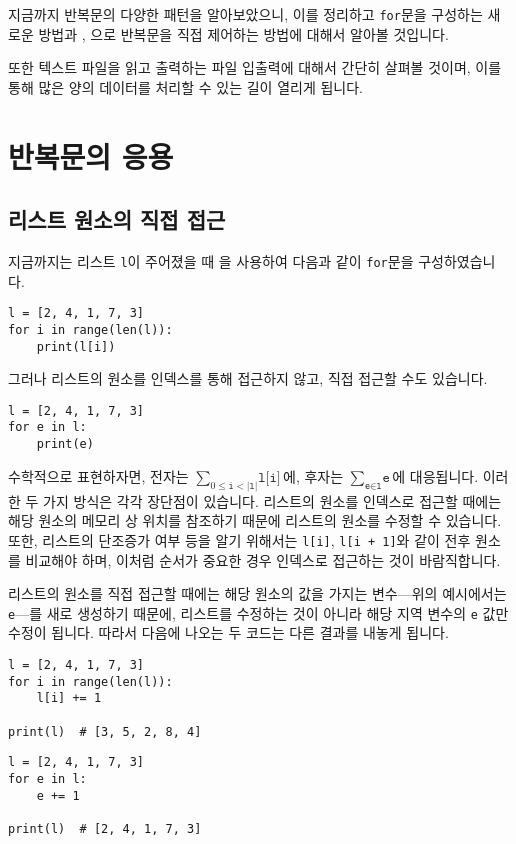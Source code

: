 \documentclass[../main.tex]{subfiles}
\begin{document}
지금까지 반복문의 다양한 패턴을 알아보았으니, 이를 정리하고 \texttt{for}문을 구성하는 새로운 방법과 , 으로 반복문을 직접 제어하는 방법에 대해서 알아볼 것입니다.

또한 텍스트 파일을 읽고 출력하는 파일 입출력에 대해서 간단히 살펴볼 것이며, 이를 통해 많은 양의 데이터를 처리할 수 있는 길이 열리게 됩니다.

\section{반복문의 응용}
\subsection{리스트 원소의 직접 접근}
지금까지는 리스트 \texttt{l}이 주어졌을 때 을 사용하여 다음과 같이 \texttt{for}문을 구성하였습니다.
\begin{verbatim}
l = [2, 4, 1, 7, 3]
for i in range(len(l)):
    print(l[i])
\end{verbatim}
그러나 리스트의 원소를 인덱스를 통해 접근하지 않고, 직접 접근할 수도 있습니다.
\begin{verbatim}
l = [2, 4, 1, 7, 3]
for e in l:
    print(e)
\end{verbatim}

수학적으로 표현하자면, 전자는 $\sum_{0 \le \texttt{i} < |\texttt{l}|} \texttt{l[i]}$에, 후자는 $\sum_{\texttt{e} \in \texttt{l}} \texttt{e}$에 대응됩니다. 이러한 두 가지 방식은 각각 장단점이 있습니다.
리스트의 원소를 인덱스로 접근할 때에는 해당 원소의 메모리 상 위치를 참조하기 때문에 리스트의 원소를 수정할 수 있습니다.
또한, 리스트의 단조증가 여부 등을 알기 위해서는 \texttt{l[i]}, \texttt{l[i + 1]}와 같이 전후 원소를 비교해야 하며, 이처럼 순서가 중요한 경우 인덱스로 접근하는 것이 바람직합니다.

리스트의 원소를 직접 접근할 때에는 해당 원소의 값을 가지는 변수---위의 예시에서는 \texttt{e}---를 새로 생성하기 때문에, 리스트를 수정하는 것이 아니라 해당 지역 변수의 \texttt{e} 값만 수정이 됩니다.
따라서 다음에 나오는 두 코드는 다른 결과를 내놓게 됩니다.
\begin{verbatim}
l = [2, 4, 1, 7, 3]
for i in range(len(l)):
    l[i] += 1

print(l)  # [3, 5, 2, 8, 4]
\end{verbatim}
\begin{verbatim}
l = [2, 4, 1, 7, 3]
for e in l:
    e += 1

print(l)  # [2, 4, 1, 7, 3]
\end{verbatim}
\end{document}
